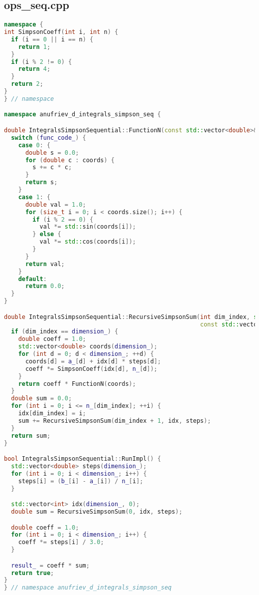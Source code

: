 \documentclass[a4paper,12pt]{article}
\begin{document}
\subsection{ops\_seq.cpp}
\begin{lstlisting}[language=C++, caption=Ключевые функции из ops\_seq.cpp, basicstyle=\ttfamily\tiny]
namespace {
int SimpsonCoeff(int i, int n) {
  if (i == 0 || i == n) {
    return 1;
  }
  if (i % 2 != 0) {
    return 4;
  }
  return 2;
}
} // namespace

namespace anufriev_d_integrals_simpson_seq {

double IntegralsSimpsonSequential::FunctionN(const std::vector<double>& coords) const {
  switch (func_code_) {
    case 0: {
      double s = 0.0;
      for (double c : coords) {
        s += c * c;
      }
      return s;
    }
    case 1: {
      double val = 1.0;
      for (size_t i = 0; i < coords.size(); i++) {
        if (i % 2 == 0) {
          val *= std::sin(coords[i]);
        } else {
          val *= std::cos(coords[i]);
        }
      }
      return val;
    }
    default:
      return 0.0;
  }
}

double IntegralsSimpsonSequential::RecursiveSimpsonSum(int dim_index, std::vector<int>& idx,
                                                       const std::vector<double>& steps) const {
  if (dim_index == dimension_) {
    double coeff = 1.0;
    std::vector<double> coords(dimension_);
    for (int d = 0; d < dimension_; ++d) {
      coords[d] = a_[d] + idx[d] * steps[d];
      coeff *= SimpsonCoeff(idx[d], n_[d]);
    }
    return coeff * FunctionN(coords);
  }
  double sum = 0.0;
  for (int i = 0; i <= n_[dim_index]; ++i) {
    idx[dim_index] = i;
    sum += RecursiveSimpsonSum(dim_index + 1, idx, steps);
  }
  return sum;
}

bool IntegralsSimpsonSequential::RunImpl() {
  std::vector<double> steps(dimension_);
  for (int i = 0; i < dimension_; i++) {
    steps[i] = (b_[i] - a_[i]) / n_[i];
  }

  std::vector<int> idx(dimension_, 0);
  double sum = RecursiveSimpsonSum(0, idx, steps);

  double coeff = 1.0;
  for (int i = 0; i < dimension_; i++) {
    coeff *= steps[i] / 3.0;
  }

  result_ = coeff * sum;
  return true;
}
} // namespace anufriev_d_integrals_simpson_seq
\end{lstlisting}

\newpage
\end{document}
